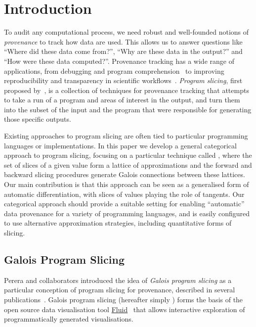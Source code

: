 \section{Introduction}
\label{sec:introduction}

To audit any computational process, we need robust and well-founded notions of \emph{provenance} to track how data are used. This allows us to answer questions like ``Where did these data come from?'', ``Why are these data in the output?'' and ``How were these data computed?''. Provenance tracking has a wide range of applications, from debugging and program comprehension~\cite{buneman95,cheney07} to improving reproducibility and transparency in scientific workflows~\cite{kontogiannis08}. \emph{Program slicing}, first proposed by~\citet{weiser81}, is a collection of techniques for provenance tracking that attempts to take a run of a program and areas of interest in the output, and turn them into the subset of the input and the program that were responsible for generating those specific outputs.

Existing approaches to program slicing are often tied to particular programming languages or implementations.
In this paper we develop a general categorical approach to program slicing, focusing on a particular technique
called \GPS, where the set of slices of a given value form a lattice of approximations and the forward and
backward slicing procedures generate Galois connections between these lattices. Our main contribution is that
this approach can be seen as a generalised form of automatic differentiation, with slices of values playing
the role of tangents. Our categorical approach should provide a suitable setting for enabling ``automatic''
data provenance for a variety of programming languages, and is easily configured to use alternative
approximation strategies, including quantitative forms of slicing.

\subsection{Galois Program Slicing}
\label{sec:introduction:galois-slicing}

Perera and collaborators introduced the idea of {\em Galois program slicing} as a particular conception of program slicing for provenance, described in several publications~\cite{perera12a,perera16d,ricciotti17}. Galois program slicing (hereafter simply {\emph \GPS}) forms the basis of the open source data visualisation tool \href{https://f.luid.org/}{Fluid}~\cite{perera2025fluid} that allows interactive exploration of programmatically generated visualisations.

